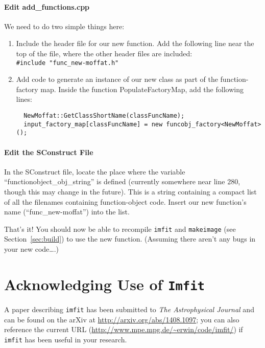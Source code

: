 \documentclass[10pt,a4paper,article]{memoir}
\newcommand{\imfit}{\texttt{imfit}}
\newcommand{\Imfit}{\texttt{Imfit}}
\newcommand{\makeimage}{\texttt{makeimage}}
\begin{document}
\subsubsection{Edit add\_functions.cpp}

We need to do two simple things here:
\begin{enumerate}
\item Include the header file for our new function. Add the following line near
the top of the file, where the other header files are included:\\
\texttt{\#include "func\_new-moffat.h"}

\item Add code to generate an instance of our new class as part of the
function-factory map. Inside the function PopulateFactoryMap, add the following lines:
\begin{verbatim}
  NewMoffat::GetClassShortName(classFuncName);
  input_factory_map[classFuncName] = new funcobj_factory<NewMoffat>();
\end{verbatim}

\end{enumerate}



\subsubsection{Edit the SConstruct File}

In the SConstruct file, locate the place where the variable
``functionobject\_obj\_string'' is defined (currently somewhere near line 280,
though this may change in the future). This is a string containing a
compact list of all the filenames containing function-object code. Insert our
new function's name (``func\_new-moffat'') into the list.

\bigskip

That's it! You should now be able to recompile \imfit{} and \makeimage{} 
(see Section~\ref{sec:build}) to use
the new function. (Assuming there aren't any bugs in your new code\ldots.)



\chapter{Acknowledging Use of \Imfit}

A paper describing \imfit{} has been submitted to \textit{The Astrophysical Journal}
and can be found on the arXiv at \url{http://arxiv.org/abs/1408.1097}; you can also
reference the current URL (\url{http://www.mpe.mpg.de/~erwin/code/imfit/}) if \imfit{} has
been useful in your research.
\end{document}
